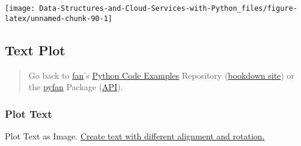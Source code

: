 \documentclass[
]{book}
\begin{document}
\begin{center}\texttt{[image: Data-Structures-and-Cloud-Services-with-Python\_files/figure-latex/unnamed-chunk-90-1]} \end{center}

\hypertarget{text-plot}{%
\subsection{Text Plot}\label{text-plot}}

\begin{quote}
Go back to \href{http://fanwangecon.github.io/}{fan}'s \href{https://fanwangecon.github.io/Py4Econ/}{Python Code Examples} Repository (\href{https://fanwangecon.github.io/Py4Econ/bookdown}{bookdown site}) or the \href{https://pyfan.readthedocs.io/en/latest/}{pyfan} Package (\href{https://pyfan.readthedocs.io/en/latest/reference.html}{API}).
\end{quote}

\hypertarget{plot-text}{%
\subsubsection{Plot Text}\label{plot-text}}

Plot Text as Image. \href{https://matplotlib.org/3.1.1/gallery/pyplots/text_layout.html\#sphx-glr-gallery-pyplots-text-layout-py}{Create text with different alignment and rotation.}
\end{document}
